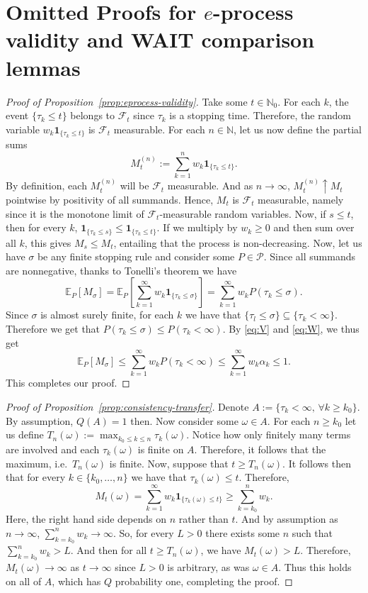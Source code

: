 \documentclass{article}
\newcommand{\NN}{\mathbb N}
\newcommand{\PP}{\mathcal P}
\newcommand{\ind}[1]{\mathbf{1}_{\{#1\}}}
\newcommand{\EE}{\mathbb E}
\theoremstyle{definition}
\begin{document}
\section{Omitted Proofs for $e$-process validity and WAIT comparison lemmas}
\begin{proof}[Proof of Proposition~\ref{prop:eprocess-validity}]
Take some $t\in\mathbb N_0$. For each $k$, the event $\{\tau_k\le t\}$ belongs to $\mathcal F_t$ since $\tau_k$ is a stopping time. Therefore, the random variable $w_k\ind{\tau_k\le t}$ is $\mathcal F_t$ measurable. For each $n\in\NN$, let us now define the partial sums
\[
M_t^{(n)}:=\sum_{k=1}^n w_k \ind{\tau_k\le t}.
\]
By definition, each $M_t^{(n)}$ will be $\mathcal F_t$ measurable. And as $n\to\infty$, $M_t^{(n)}\uparrow M_t$ pointwise by positivity of all summands. Hence, $M_t$ is $\mathcal F_t$ measurable, namely since it is the monotone limit of $\mathcal F_t$-measurable random variables. Now, if $s\le t$, then for every $k$, $\ind{\tau_k\le s}\le \ind{\tau_k\le t}$. If we multiply by $w_k\ge 0$ and then sum over all $k$, this gives $M_s\le M_t$, entailing that the process is non-decreasing. Now, let us have $\sigma$ be any finite stopping rule and consider some $P\in\PP$. Since all summands are nonnegative, thanks to Tonelli's theorem we have
\[
\EE_P[M_\sigma]=\EE_P\left[\sum_{k=1}^{\infty}w_k\ind{\tau_k\le \sigma}\right]=\sum_{k=1}^{\infty}w_k P(\tau_k\le\sigma).
\]
Since $\sigma$ is almost surely finite, for each $k$ we have that $\{\tau_l\le\sigma\}\subseteq \{\tau_k<\infty\}$. Therefore we get that $P(\tau_k\le \sigma)\le P(\tau_k<\infty)$. By \eqref{eq:V} and \eqref{eq:W}, we thus get
\[
\EE_P[M_{\sigma}]\le \sum_{k=1}^{\infty}w_k P(\tau_k<\infty)\le \sum_{k=1}^{\infty}w_k\alpha_k\le 1.
\]
This completes our proof.
\end{proof}

\begin{proof}[Proof of Proposition~\ref{prop:consistency-transfer}]
Denote $A:=\{\tau_k<\infty,\, \forall k\ge k_0\}$. By assumption, $Q(A)=1$ then. Now consider some $\omega\in A$. For each $n\ge k_0$ let us define $T_n(\omega):=\max_{k_0\le k\le n}\tau_k(\omega)$. Notice how only finitely many terms are involved and each $\tau_k(\omega)$ is finite on $A$. Therefore, it follows that the maximum, i.e.\ $T_n(\omega)$ is finite. Now, suppose that $t\ge T_n(\omega)$. It follows then that for every $k\in\{k_0, \dots, n\}$ we have that $\tau_k(\omega)\le t$. Therefore,
\[
M_t(\omega)=\sum_{k=1}^{\infty} w_k\ind{\tau_k(\omega)\le t}\ge \sum_{k=k_0}^n w_k.
\]
Here, the right hand side depends on $n$ rather than $t$. And by assumption as $n\to\infty$, $\sum_{k=k_0}^n w_k\to\infty$. So, for every $L>0$ there exists some $n$ such that $\sum_{k=k_0}^n w_k>L$. And then for all $t\ge T_n(\omega)$, we have $M_t(\omega)>L$. Therefore, $M_t(\omega)\to\infty$ as $t\to\infty$ since $L>0$ is arbitrary, as was $\omega\in A$. Thus this holds on all of $A$, which has $Q$ probability one, completing the proof.
\end{proof}
\end{document}
